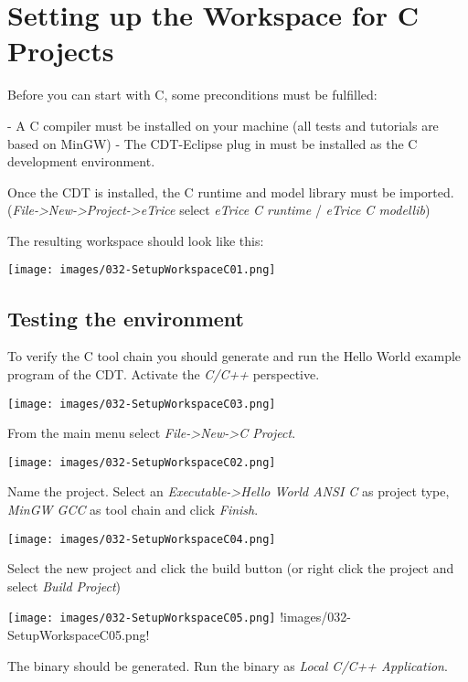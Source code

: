 \chapter{Setting up the Workspace for C Projects}
 
Before you can start with C, some preconditions must be fulfilled:

\begin{description}
- A C compiler must be installed on your machine (all tests and tutorials are based on MinGW)
- The CDT-Eclipse plug in must be installed as the C development environment.
\end{description}

Once the CDT is installed, the C runtime and model library must be imported. 
(\textit{File->New->Project->eTrice} select \textit{eTrice C runtime} / \textit{eTrice C modellib})

The resulting workspace should look like this:

\texttt{[image: images/032-SetupWorkspaceC01.png]}


\section{Testing the environment}

To verify the C tool chain you should generate and run the Hello World example program of the CDT.
 Activate the \textit{C/C++} perspective. 

\texttt{[image: images/032-SetupWorkspaceC03.png]} 
 
From the main menu select \textit{File->New->C Project}.
 
\texttt{[image: images/032-SetupWorkspaceC02.png]}

Name the project. Select an \textit{Executable->Hello World ANSI C} as project type, \textit{MinGW GCC} as tool chain and click \textit{Finish}. 
 
\texttt{[image: images/032-SetupWorkspaceC04.png]}

Select the new project and click the build button (or right click the project and select \textit{Build Project})

\texttt{[image: images/032-SetupWorkspaceC05.png]}
!images/032-SetupWorkspaceC05.png!

The binary should be generated. Run the binary as \textit{Local C/C++ Application}.

